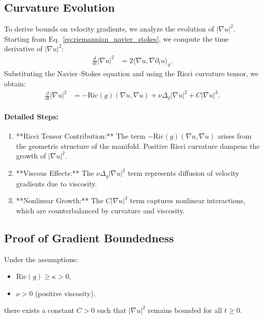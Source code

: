 \documentclass[12pt]{article}
\theoremstyle{definition}
\begin{document}
\subsection{Curvature Evolution}
To derive bounds on velocity gradients, we analyze the evolution of $|\nabla u|^2$. Starting from Eq.~\eqref{eq:riemannian_navier_stokes}, we compute the time derivative of $|\nabla u|^2$:
\begin{align}
\frac{d}{dt} |\nabla u|^2 &= 2 \langle \nabla u, \nabla \partial_t u \rangle_g. \label{eq:gradient_time_evolution}
\end{align}
Substituting the Navier--Stokes equation and using the Ricci curvature tensor, we obtain:
\begin{align}
\frac{\partial}{\partial t} |\nabla u|^2 &= - \text{Ric}(g)(\nabla u, \nabla u) + \nu \Delta_g |\nabla u|^2 + C |\nabla u|^3. \label{eq:ricci_curvature_evolution}
\end{align}

\paragraph{Detailed Steps:}
\begin{enumerate}
    \item **Ricci Tensor Contribution:**
    The term $- \text{Ric}(g)(\nabla u, \nabla u)$ arises from the geometric structure of the manifold. Positive Ricci curvature dampens the growth of $|\nabla u|^2$.
    \item **Viscous Effects:**
    The $\nu \Delta_g |\nabla u|^2$ term represents diffusion of velocity gradients due to viscosity.
    \item **Nonlinear Growth:**
    The $C |\nabla u|^3$ term captures nonlinear interactions, which are counterbalanced by curvature and viscosity.
\end{enumerate}

\subsection{Proof of Gradient Boundedness}
\begin{theorem}
Under the assumptions:
\begin{itemize}
    \item $\text{Ric}(g) \geq \kappa > 0$,
    \item $\nu > 0$ (positive viscosity),
\end{itemize}
there exists a constant $C > 0$ such that $|\nabla u|^2$ remains bounded for all $t \geq 0$.
\end{theorem}
\end{document}
